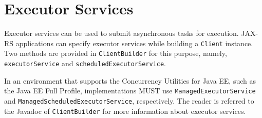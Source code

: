 \section{Executor Services}
\label{executor_services}

Executor services can be used to submit asynchronous tasks for execution. JAX-RS applications can specify executor
services while building a \lstinline{Client} instance. Two methods are provided in \lstinline{ClientBuilder} for this
purpose, namely, \lstinline{executorService} and \lstinline{scheduledExecutorService}.

In an environment that supports the Concurrency Utilities for Java EE, such as the Java EE Full Profile, implementations
MUST use \lstinline{ManagedExecutorService} and \lstinline{ManagedScheduledExecutorService}, respectively. The reader is
referred to the Javadoc of \lstinline{ClientBuilder} for more information about executor services.
